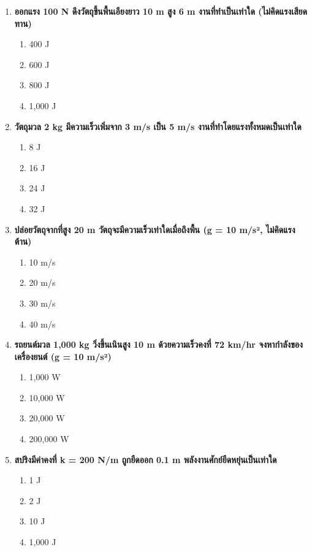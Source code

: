\documentclass[12pt]{article}
\begin{document}
\begin{enumerate}
\begin{enumerate}[label=\alph*)]
\item 50 W
\item 100 W
\item 200 W
\end{enumerate}
\item \textbf{ออกแรง 100 N ดึงวัตถุขึ้นพื้นเอียงยาว 10 m สูง 6 m งานที่ทำเป็นเท่าใด (ไม่คิดแรงเสียดทาน)}
\begin{enumerate}[label=\alph*)]
\item 400 J
\item 600 J
\item 800 J
\item 1,000 J
\end{enumerate}
\item \textbf{วัตถุมวล 2 kg มีความเร็วเพิ่มจาก 3 m/s เป็น 5 m/s งานที่ทำโดยแรงทั้งหมดเป็นเท่าใด}
\begin{enumerate}[label=\alph*)]
\item 8 J
\item 16 J
\item 24 J
\item 32 J
\end{enumerate}
\item \textbf{ปล่อยวัตถุจากที่สูง 20 m วัตถุจะมีความเร็วเท่าใดเมื่อถึงพื้น (g = 10 m/s², ไม่คิดแรงต้าน)}
\begin{enumerate}[label=\alph*)]
\item 10 m/s
\item 20 m/s
\item 30 m/s
\item 40 m/s
\end{enumerate}
\item \textbf{รถยนต์มวล 1,000 kg วิ่งขึ้นเนินสูง 10 m ด้วยความเร็วคงที่ 72 km/hr จงหากำลังของเครื่องยนต์ (g = 10 m/s²)}
\begin{enumerate}[label=\alph*)]
\item 1,000 W
\item 10,000 W
\item 20,000 W
\item 200,000 W
\end{enumerate}
\item \textbf{สปริงมีค่าคงที่ k = 200 N/m ถูกยืดออก 0.1 m พลังงานศักย์ยืดหยุ่นเป็นเท่าใด}
\begin{enumerate}[label=\alph*)]
\item 1 J
\item 2 J
\item 10 J
\item 1,000 J
\end{enumerate}

\end{enumerate}
\end{document}
